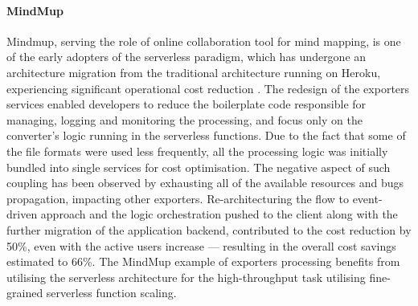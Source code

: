 

\paragraph*{MindMup}

Mindmup, serving the role of online collaboration tool for mind mapping, is one of the early adopters of the serverless paradigm, which has undergone an architecture migration from the traditional architecture running on Heroku, experiencing significant operational cost reduction \cite{ServerlessComputingEconomicAndArchitecturalImpact}.
The redesign of the exporters services enabled developers to reduce the boilerplate code responsible for managing, logging and monitoring the processing, and focus only on the converter's logic running in the serverless functions.
Due to the fact that some of the file formats were used less frequently, all the processing logic was initially bundled into single services for cost optimisation. The negative aspect of such coupling has been observed by exhausting all of the available resources and bugs propagation, impacting other exporters.
Re-architecturing the flow to event-driven approach and the logic orchestration pushed to the client along with the further migration of the application backend, contributed to the cost reduction by 50\%, even with the active users increase --- resulting in the overall cost savings estimated to 66\%.
The MindMup example of exporters processing benefits from utilising the serverless architecture for the high-throughput task utilising fine-grained serverless function scaling.


